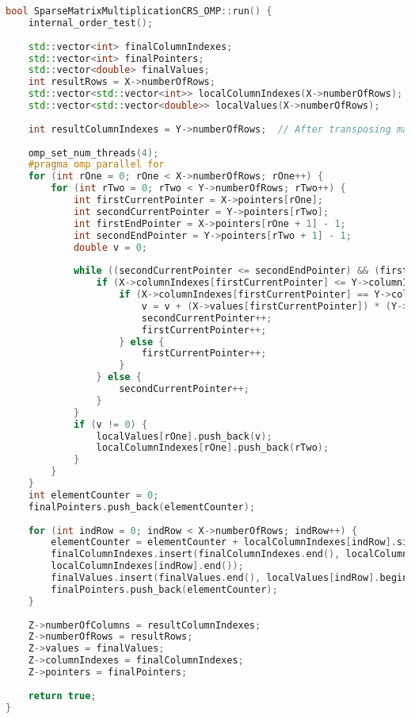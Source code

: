 \documentclass[a4paper, 14pt]{article}
\theoremstyle{plain}
\begin{document}
\begin{lstlisting}[language=C++,caption=Реализация метода run() в параллельной (OMP) версии программы]
bool SparseMatrixMultiplicationCRS_OMP::run() {
	internal_order_test();
	
	std::vector<int> finalColumnIndexes;
	std::vector<int> finalPointers;
	std::vector<double> finalValues;
	int resultRows = X->numberOfRows;
	std::vector<std::vector<int>> localColumnIndexes(X->numberOfRows);
	std::vector<std::vector<double>> localValues(X->numberOfRows);
	
	int resultColumnIndexes = Y->numberOfRows;  // After transposing matrix Y
	
	omp_set_num_threads(4);
	#pragma omp parallel for
	for (int rOne = 0; rOne < X->numberOfRows; rOne++) {
		for (int rTwo = 0; rTwo < Y->numberOfRows; rTwo++) {
			int firstCurrentPointer = X->pointers[rOne];
			int secondCurrentPointer = Y->pointers[rTwo];
			int firstEndPointer = X->pointers[rOne + 1] - 1;
			int secondEndPointer = Y->pointers[rTwo + 1] - 1;
			double v = 0;
			
			while ((secondCurrentPointer <= secondEndPointer) && (firstCurrentPointer <= firstEndPointer)) {
				if (X->columnIndexes[firstCurrentPointer] <= Y->columnIndexes[secondCurrentPointer]) {
					if (X->columnIndexes[firstCurrentPointer] == Y->columnIndexes[secondCurrentPointer]) {
						v = v + (X->values[firstCurrentPointer]) * (Y->values[secondCurrentPointer]);
						secondCurrentPointer++;
						firstCurrentPointer++;
					} else {
						firstCurrentPointer++;
					}
				} else {
					secondCurrentPointer++;
				}
			}
			if (v != 0) {
				localValues[rOne].push_back(v);
				localColumnIndexes[rOne].push_back(rTwo);
			}
		}
	}
	int elementCounter = 0;
	finalPointers.push_back(elementCounter);
	
	for (int indRow = 0; indRow < X->numberOfRows; indRow++) {
		elementCounter = elementCounter + localColumnIndexes[indRow].size();
		finalColumnIndexes.insert(finalColumnIndexes.end(), localColumnIndexes[indRow].begin(),
		localColumnIndexes[indRow].end());
		finalValues.insert(finalValues.end(), localValues[indRow].begin(), localValues[indRow].end());
		finalPointers.push_back(elementCounter);
	}
	
	Z->numberOfColumns = resultColumnIndexes;
	Z->numberOfRows = resultRows;
	Z->values = finalValues;
	Z->columnIndexes = finalColumnIndexes;
	Z->pointers = finalPointers;
	
	return true;
}
\end{lstlisting}
\end{document}
